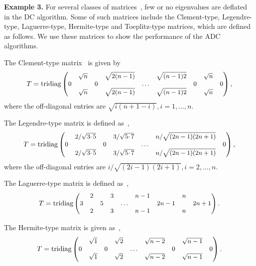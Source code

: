 \documentclass[times]{nlaauth}
\newcounter{algorithm}
\begin{document}
{\bf Example 3.}
For several classes of matrices~\cite{A880}, few or no eigenvalues are deflated
in the DC algorithm. Some of such matrices include
the Clement-type, Legendre-type, Laguerre-type, Hermite-type and Toeplitz-type matrices, which are defined as follows.
We use these matrices to show the performance of the ADC algorithms.

The Clement-type matrix~\cite{A880} is given by
\begin{equation}
  \label{eq:Clement-Tri}
  T=\text{tridiag} \small
  \begin{pmatrix}
    &\sqrt{n} & & \sqrt{2(n-1)} & & \sqrt{(n-1)2} & & \sqrt{n} & \\
    0 & & 0 & & \ldots & & 0 & & 0 \\
    &\sqrt{n} & & \sqrt{2(n-1)} & & \sqrt{(n-1)2} & & \sqrt{n} & \\
  \end{pmatrix},
\end{equation}
where the off-diagonal entries are $\sqrt{i(n+1-i)}, i=1,\ldots,n$.

The Legendre-type matrix is defined as~\cite{A880,Handbook-Func},
\begin{equation}
  \label{eq:Legendre-Tri}
  T=\text{tridiag} \small
  \begin{pmatrix}
    &2/\sqrt{3\cdotp 5} & & 3/\sqrt{5\cdotp 7} & & n/\sqrt{(2n-1)(2n+1)} & \\
    0 & & 0 & & \ldots & & 0 \\
    &2/\sqrt{3\cdotp 5} & & 3/\sqrt{5\cdotp 7} & & n/\sqrt{(2n-1)(2n+1)} & \\
  \end{pmatrix},
\end{equation}
where the off-diagonal entries are $i/\sqrt{(2i-1)(2i+1)}, i=2,\ldots,n$.

The Laguerre-type matrix is defined as~\cite{A880},
\begin{equation}
  \label{eq:Laguerre-Tri}
  T=\text{tridiag} \small
  \begin{pmatrix}
    &2 & & 3 & & n-1 & & n & \\
    3 & & 5 & & \ldots & & 2n-1 & & 2n+1 \\
    &2 & & 3 & & n-1 & & n & \\
  \end{pmatrix}.
\end{equation}

The Hermite-type matrix is given as~\cite{A880},
\begin{equation}
  \label{eq:Hermite-Tri}
  T=\text{tridiag} \small
  \begin{pmatrix}
    &\sqrt{1} & & \sqrt{2} & & \sqrt{n-2} & & \sqrt{n-1} & \\
    0 & & 0 & & \ldots & & 0 & & 0 \\
    &\sqrt{1} & & \sqrt{2} & & \sqrt{n-2} & & \sqrt{n-1} & \\
  \end{pmatrix}.
\end{equation}
\end{document}
